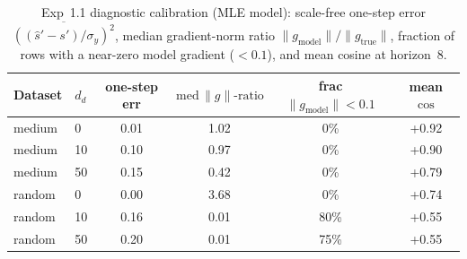 \begin{table}[htbp]
\centering
\caption{Exp~1.1 diagnostic calibration (MLE model): scale-free one-step error $\overline{((\hat s'-s')/\sigma_y)^2}$, median gradient-norm ratio $\|\!g_{\text{model}}\!\|/\|\!g_{\text{true}}\!\|$, fraction of rows with a near-zero model gradient ($<0.1$), and mean cosine at horizon~8.}
\label{tab:h11quality}
\begin{tabular}{llcccc}
\toprule
Dataset & $d_d$ & one-step err & $\text{med}\,\|\!g\|\text{-ratio}$ & frac $\|\!g_{\text{model}}\!\|<0.1$ & mean $\cos$ \\
\midrule
medium & 0 & 0.01 & 1.02 & 0\% & +0.92 \\
medium & 10 & 0.10 & 0.97 & 0\% & +0.90 \\
medium & 50 & 0.15 & 0.42 & 0\% & +0.79 \\
random & 0 & 0.00 & 3.68 & 0\% & +0.74 \\
random & 10 & 0.16 & 0.01 & 80\% & +0.55 \\
random & 50 & 0.20 & 0.01 & 75\% & +0.55 \\
\bottomrule
\end{tabular}
\end{table}
